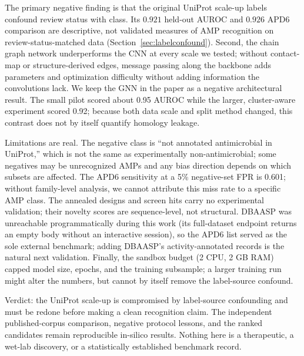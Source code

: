The primary negative finding is that the original UniProt scale-up labels
confound review status with class. Its $0.921$ held-out AUROC and $0.926$
APD6 comparison are descriptive, not validated measures of AMP recognition
on review-status-matched data (Section~\ref{sec:labelconfound}). Second, the chain
graph network underperforms the CNN at every scale we tested; without
contact-map or structure-derived edges, message passing along the backbone
adds parameters and optimization difficulty without adding information the
convolutions lack. We keep the GNN in the paper as a negative architectural
result. The small pilot scored about 0.95 AUROC while the larger, cluster-aware
experiment scored 0.92; because both data scale and split method changed,
this contrast does not by itself quantify homology leakage.

Limitations are real. The negative class is ``not annotated antimicrobial in
UniProt,'' which is not the same as experimentally non-antimicrobial; some negatives may be unrecognized AMPs and any bias direction depends on
which subsets are affected. The APD6 sensitivity at a 5\% negative-set FPR is 0.601; without
family-level analysis, we cannot attribute this miss rate to a specific
AMP class. The annealed designs and screen hits carry
no experimental validation; their novelty scores are sequence-level, not
structural. DBAASP was unreachable programmatically during this work (its
full-dataset endpoint returns an empty body without an interactive session),
so the APD6 list served as the sole external benchmark; adding DBAASP's
activity-annotated records is the natural next validation. Finally, the
sandbox budget (2 CPU, 2 GB RAM) capped model size, epochs, and the training
subsample; a larger training run might alter the numbers, but cannot by itself
remove the label-source confound.

Verdict: the UniProt scale-up is compromised by label-source confounding
and must be redone before making a clean recognition claim. The independent
published-corpus comparison, negative protocol lessons, and the ranked
candidates remain reproducible in-silico results. Nothing here is a
therapeutic, a wet-lab discovery, or a statistically established benchmark
record.
